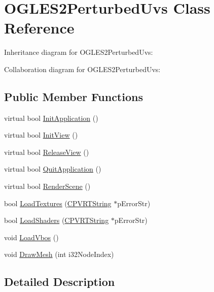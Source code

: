 \hypertarget{class_o_g_l_e_s2_perturbed_uvs}{\section{O\+G\+L\+E\+S2\+Perturbed\+Uvs Class Reference}
\label{class_o_g_l_e_s2_perturbed_uvs}
}


Inheritance diagram for O\+G\+L\+E\+S2\+Perturbed\+Uvs\+:


Collaboration diagram for O\+G\+L\+E\+S2\+Perturbed\+Uvs\+:
\subsection*{Public Member Functions}
\begin{DoxyCompactItemize}
\item 
virtual bool \hyperlink{class_o_g_l_e_s2_perturbed_uvs_a4651ff6a8e29d6d59adc85afc77db21e}{Init\+Application} ()
\item 
virtual bool \hyperlink{class_o_g_l_e_s2_perturbed_uvs_aafd260be0ffc5e2c6b9ae9d5ca1beceb}{Init\+View} ()
\item 
virtual bool \hyperlink{class_o_g_l_e_s2_perturbed_uvs_a24c720a37d67dd262e5c457d1a4eb0d4}{Release\+View} ()
\item 
virtual bool \hyperlink{class_o_g_l_e_s2_perturbed_uvs_ac3d9d71a37120d6c700754fb69003c06}{Quit\+Application} ()
\item 
virtual bool \hyperlink{class_o_g_l_e_s2_perturbed_uvs_a0bd177f9c378626d6ed1850fd4208c1f}{Render\+Scene} ()
\item 
bool \hyperlink{class_o_g_l_e_s2_perturbed_uvs_a9c4362f1610e2d493423b16da136db46}{Load\+Textures} (\hyperlink{class_c_p_v_r_t_string}{C\+P\+V\+R\+T\+String} $\ast$p\+Error\+Str)
\item 
bool \hyperlink{class_o_g_l_e_s2_perturbed_uvs_ac94b938de8ec8ffc528bb1c2fb802b6e}{Load\+Shaders} (\hyperlink{class_c_p_v_r_t_string}{C\+P\+V\+R\+T\+String} $\ast$p\+Error\+Str)
\item 
void \hyperlink{class_o_g_l_e_s2_perturbed_uvs_abe46048949e156014a6c5234b28edba3}{Load\+Vbos} ()
\item 
void \hyperlink{class_o_g_l_e_s2_perturbed_uvs_a91eda2c2390e7ada07e8b57d2fe4a62c}{Draw\+Mesh} (int i32\+Node\+Index)
\end{DoxyCompactItemize}


\subsection{Detailed Description}


